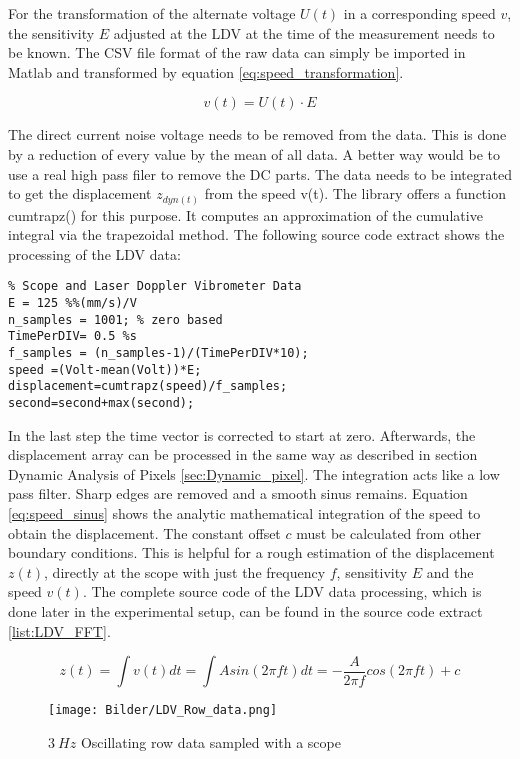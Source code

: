 For the transformation of the alternate voltage $U(t)$ in a corresponding speed $v$, the sensitivity $E$ adjusted at the LDV at the time of the measurement needs to be known. The CSV file format of the raw data can simply be imported in Matlab and transformed by equation \ref{eq:speed_transformation}.

\begin{equation}
\label{eq:speed_transformation}
v(t) = U(t) \cdot E
\end{equation}

 The direct current noise voltage needs to be removed from the data. This is done by a reduction of every value by the mean of all data. A better way would be to use a real high pass filer to remove the DC parts. The data needs to be integrated to get the displacement $z_{dyn(t)}$ from the speed v(t). The library offers a function cumtrapz() for this purpose. It computes an approximation of the cumulative integral via the trapezoidal method. The following source code extract shows the processing of the LDV data:

\begin{lstlisting} 
% Scope and Laser Doppler Vibrometer Data
E = 125 %%(mm/s)/V
n_samples = 1001; % zero based
TimePerDIV= 0.5 %s
f_samples = (n_samples-1)/(TimePerDIV*10);
speed =(Volt-mean(Volt))*E;
displacement=cumtrapz(speed)/f_samples; 
second=second+max(second);
\end{lstlisting} 

In the last step the time vector is corrected to start at zero. Afterwards, the displacement array can be processed in the same way as described in section Dynamic Analysis of Pixels \ref{sec:Dynamic_pixel}. The integration acts like a low pass filter. Sharp edges are removed and a smooth sinus remains. Equation \ref{eq:speed_sinus} shows the analytic mathematical integration of the speed to obtain the displacement. The constant offset $c$ must be calculated from other boundary conditions. This is helpful for a rough estimation of the displacement $z(t)$, directly at the scope with just the frequency $f$, sensitivity $E$ and the speed $v(t)$. The complete source code of the LDV data processing, which is done later in the experimental setup, can be found in the source code extract \ref{list:LDV_FFT}.

\begin{equation}
\label{eq:speed_sinus}
z(t)=\int v(t) dt = \int Asin(2\pi f t ) dt = -\frac{A}{2\pi f} cos(2\pi f t)  + c
\end{equation}


\begin{figure}[!h]
	\centering
	\texttt{[image: Bilder/LDV\_Row\_data.png]}
	\caption{$3~Hz$ Oscillating row data sampled with a scope}
	\label{fig:LDV_raw_Data}
\end{figure}

\newpage
